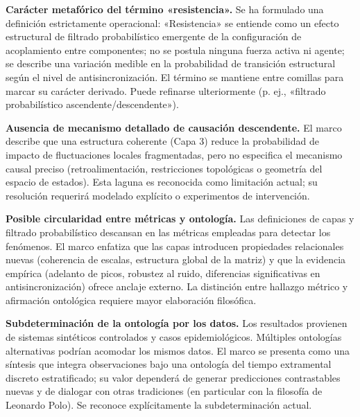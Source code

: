 \textbf{Carácter metafórico del término «resistencia».} Se ha formulado una definición estrictamente operacional: «Resistencia» se entiende como un efecto estructural de filtrado probabilístico emergente de la configuración de acoplamiento entre componentes; no se postula ninguna fuerza activa ni agente; se describe una variación medible en la probabilidad de transición estructural según el nivel de antisincronización. El término se mantiene entre comillas para marcar su carácter derivado. Puede refinarse ulteriormente (p. ej., «filtrado probabilístico ascendente/descendente»).

\textbf{Ausencia de mecanismo detallado de causación descendente.} El marco describe que una estructura coherente (Capa 3) reduce la probabilidad de impacto de fluctuaciones locales fragmentadas, pero no especifica el mecanismo causal preciso (retroalimentación, restricciones topológicas o geometría del espacio de estados). Esta laguna es reconocida como limitación actual; su resolución requerirá modelado explícito o experimentos de intervención.

\textbf{Posible circularidad entre métricas y ontología.} Las definiciones de capas y filtrado probabilístico descansan en las métricas empleadas para detectar los fenómenos. El marco enfatiza que las capas introducen propiedades relacionales nuevas (coherencia de escalas, estructura global de la matriz) y que la evidencia empírica (adelanto de picos, robustez al ruido, diferencias significativas en antisincronización) ofrece anclaje externo. La distinción entre hallazgo métrico y afirmación ontológica requiere mayor elaboración filosófica.

\textbf{Subdeterminación de la ontología por los datos.} Los resultados provienen de sistemas sintéticos controlados y casos epidemiológicos. Múltiples ontologías alternativas podrían acomodar los mismos datos. El marco se presenta como una síntesis que integra observaciones bajo una ontología del tiempo extramental discreto estratificado; su valor dependerá de generar predicciones contrastables nuevas y de dialogar con otras tradiciones (en particular con la filosofía de Leonardo Polo). Se reconoce explícitamente la subdeterminación actual.